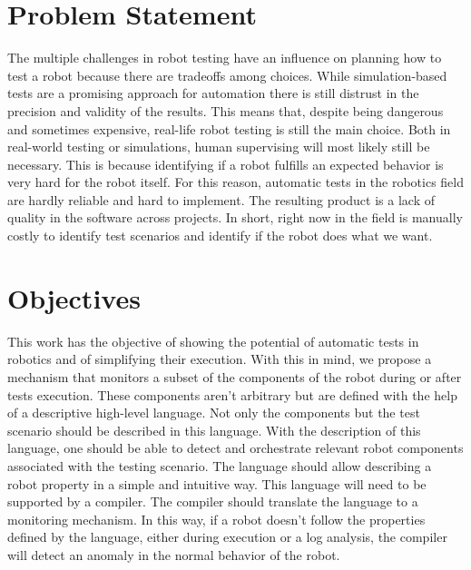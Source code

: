 \section{Problem Statement}
\label{sec:problem}

The multiple challenges in robot testing have an influence on planning 
how to test a robot because there are tradeoffs among choices.
While simulation-based tests are a promising approach for automation 
there is still distrust in the precision and validity of the results.
This means that, despite being dangerous and sometimes expensive, 
real-life robot testing is still the main choice.
Both in real-world testing or simulations, 
human supervising will most likely still be necessary.
This is because identifying if a robot fulfills an expected 
behavior is very hard for the robot itself.
For this reason, automatic tests in the robotics field are 
hardly reliable and hard to implement.
The resulting product is a lack of quality in the software 
across projects.
In short, right now in the field is manually costly to identify 
test scenarios and identify if the robot does what we want.


\section{Objectives}
\label{sec:objectives}

This work has the objective of showing the potential of automatic 
tests in robotics and of simplifying their execution.
With this in mind, we propose a mechanism that monitors a subset of 
the components of the robot during or after tests execution.
These components aren't arbitrary but are defined with the help of a descriptive high-level language.
Not only the components but the test scenario should be described in this language.
With the description of this language, one should be able to detect and 
orchestrate relevant robot components associated with the testing scenario.
The language should allow describing a robot property in a simple and intuitive way.
This language will need to be supported by a compiler. 
The compiler should translate the language to a monitoring mechanism.
In this way, if a robot doesn't follow the properties defined by the 
language, either during execution or a log analysis, the compiler will 
detect an anomaly in the normal behavior of the robot.



